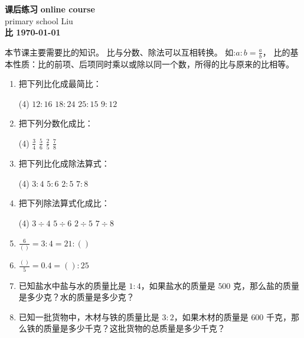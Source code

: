 \documentclass[DIN, pagenumber=false, fontsize=11pt, parskip=half]{scrartcl}
\newcommand{\mytitle}[1]{{\noindent\Large\textbf{#1}}}
\begin{document}
\noindent\textbf{课后练习} \hfill \textbf{online course}\\
primary school \hfill Liu\\

\mytitle{比 \hfill \today}
\newline
\begin{parchmentquote}
   本节课主要需要比的知识。
   比与分数、除法可以互相转换。
   如:$a:b =\frac{a}{b} $，\newline
    比的基本性质：比的前项、后项同时乘以或除以同一个数，所得的比与原来的比相等。

\end{parchmentquote}

\begin{enumerate}
    \item 把下列比化成最简比：
    \begin{tasks}(4)
        \task $12:16$
        \task $18:24$
        \task $25:15$
        \task $9:12$
    \end{tasks}

    \item 把下列分数化成比：
    \begin{tasks}(4)    
        \task $\frac{3}{4}$
        \task $\frac{5}{6}$
        \task $\frac{2}{5}$
        \task $\frac{7}{8}$
    \end{tasks}
    \item 把下列比化成除法算式：
    \begin{tasks}(4)
        \task $3:4$
        \task $5:6$ 
        \task $2:5$
        \task $7:8$
    \end{tasks}
    \item 把下列除法算式化成比：
    \begin{tasks}(4)
        \task $3\div 4$     
        \task $5\div 6$
        \task $2\div 5$
        \task $7\div 8$
    \end{tasks}
    \item $\frac{6}{()} = 3:4=21:()$
    \item $\frac{()}{5} = 0.4=() : 25$
    \item 已知盐水中盐与水的质量比是 $1:4$，如果盐水的质量是 $500$ 克，那么盐的质量是多少克？水的质量是多少克？
    \item 已知一批货物中，木材与铁的质量比是 $3:2$，如果木材的质量是 $600$ 千克，那么铁的质量是多少千克？这批货物的总质量是多少千克？
      
\end{enumerate}
\end{document}
